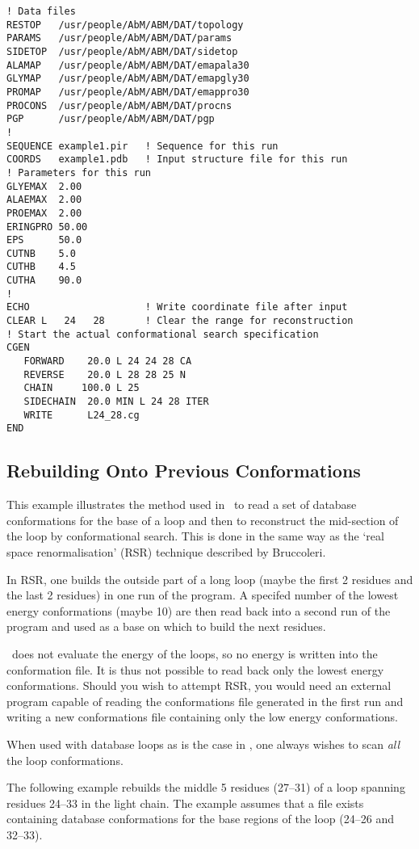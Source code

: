 \begin{verbatim}
! Data files
RESTOP   /usr/people/AbM/ABM/DAT/topology
PARAMS   /usr/people/AbM/ABM/DAT/params
SIDETOP  /usr/people/AbM/ABM/DAT/sidetop
ALAMAP   /usr/people/AbM/ABM/DAT/emapala30
GLYMAP   /usr/people/AbM/ABM/DAT/emapgly30
PROMAP   /usr/people/AbM/ABM/DAT/emappro30
PROCONS  /usr/people/AbM/ABM/DAT/procns
PGP      /usr/people/AbM/ABM/DAT/pgp
!
SEQUENCE example1.pir   ! Sequence for this run
COORDS   example1.pdb   ! Input structure file for this run
! Parameters for this run
GLYEMAX  2.00
ALAEMAX  2.00
PROEMAX  2.00
ERINGPRO 50.00
EPS      50.0
CUTNB    5.0
CUTHB    4.5
CUTHA    90.0
!
ECHO                    ! Write coordinate file after input
CLEAR L   24   28       ! Clear the range for reconstruction
! Start the actual conformational search specification
CGEN
   FORWARD    20.0 L 24 24 28 CA
   REVERSE    20.0 L 28 28 25 N
   CHAIN     100.0 L 25
   SIDECHAIN  20.0 MIN L 24 28 ITER
   WRITE      L24_28.cg
END
\end{verbatim}

\subsection{Rebuilding Onto Previous Conformations}
This example illustrates the method used in \abm\ to read a set of
database conformations for the base of a loop and then to reconstruct
the mid-section of the loop by conformational search. This is done
in the same way as the `real space renormalisation' (RSR) 
technique described by Bruccoleri\cite{bruc:congen,bruc:hy5}.

In RSR, one builds the outside part of a long loop (maybe the first 2
residues and the last 2 residues) in one run of the program. A specifed 
number of the lowest energy conformations (maybe 10) are then read back
into a second run of the program and used as a base on which to build 
the next residues.

\cs\ does not evaluate the energy of the loops, so no energy is written
into the conformation file. It is thus not possible to read back only
the lowest energy conformations. Should you wish to attempt RSR, you
would need an external program capable of reading the conformations
file generated in the first run and writing a new conformations file
containing only the low energy conformations.

When used with database loops as is the case in \abm, one always wishes
to scan {\em all\/} the loop conformations.

The following example rebuilds the middle 5 residues (27--31) of
a loop spanning residues 24--33 in the light chain. The example assumes
that a file exists containing database conformations for the base 
regions of the loop (24--26 and 32--33).

